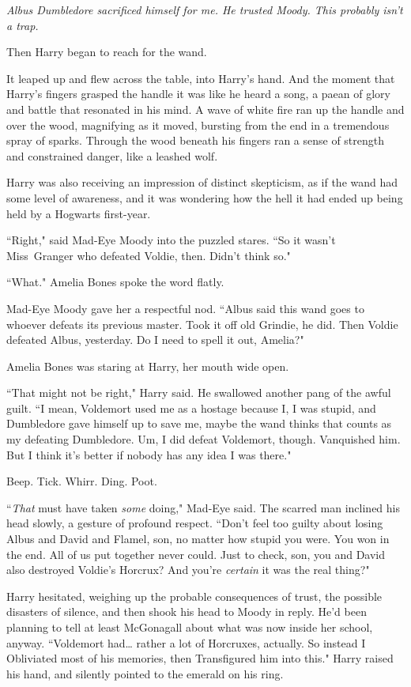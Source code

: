 \emph{Albus Dumbledore sacrificed himself for me. He trusted Moody. This probably isn't a trap.}

Then Harry began to reach for the wand.

It leaped up and flew across the table, into Harry's hand. And the moment that Harry's fingers grasped the handle it was like he heard a song, a paean of glory and battle that resonated in his mind. A wave of white fire ran up the handle and over the wood, magnifying as it moved, bursting from the end in a tremendous spray of sparks. Through the wood beneath his fingers ran a sense of strength and constrained danger, like a leashed wolf.

Harry was also receiving an impression of distinct skepticism, as if the wand had some level of awareness, and it was wondering how the hell it had ended up being held by a Hogwarts first-year.

``Right," said Mad-Eye Moody into the puzzled stares. ``So it wasn't Miss~Granger who defeated Voldie, then. Didn't think so."

``What." Amelia Bones spoke the word flatly.

Mad-Eye Moody gave her a respectful nod. ``Albus said this wand goes to whoever defeats its previous master. Took it off old Grindie, he did. Then Voldie defeated Albus, yesterday. Do I need to spell it out, Amelia?"

Amelia Bones was staring at Harry, her mouth wide open.

``That might not be right," Harry said. He swallowed another pang of the awful guilt. ``I mean, Voldemort used me as a hostage because I, I was stupid, and Dumbledore gave himself up to save me, maybe the wand thinks that counts as my defeating Dumbledore. Um, I did defeat Voldemort, though. Vanquished him. But I think it's better if nobody has any idea I was there."

Beep. Tick. Whirr. Ding. Poot.

``\emph{That} must have taken \emph{some} doing," Mad-Eye said. The scarred man inclined his head slowly, a gesture of profound respect. ``Don't feel too guilty about losing Albus and David and Flamel, son, no matter how stupid you were. You won in the end. All of us put together never could. Just to check, son, you and David also destroyed Voldie's Horcrux? And you're \emph{certain} it was the real thing?"

Harry hesitated, weighing up the probable consequences of trust, the possible disasters of silence, and then shook his head to Moody in reply. He'd been planning to tell at least McGonagall about what was now inside her school, anyway. ``Voldemort had{\ldots} rather a lot of Horcruxes, actually. So instead I Obliviated most of his memories, then Transfigured him into this." Harry raised his hand, and silently pointed to the emerald on his ring.

